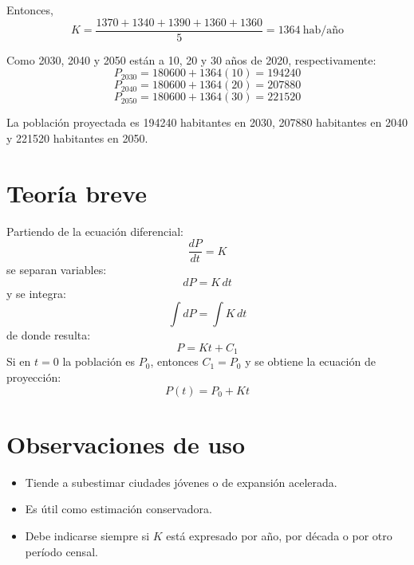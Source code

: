 \documentclass[11pt]{scrartcl}
\begin{document}
Entonces,
\[
  K=\frac{\num{1370}+\num{1340}+\num{1390}+\num{1360}+\num{1360}}{5}
    =\num{1364}\ \text{hab/año}
\]

Como 2030, 2040 y 2050 están a 10, 20 y 30 años de 2020, respectivamente:
\[
  P_{2030}=\num{180600}+\num{1364}(10)=\num{194240}
\]
\[
  P_{2040}=\num{180600}+\num{1364}(20)=\num{207880}
\]
\[
  P_{2050}=\num{180600}+\num{1364}(30)=\num{221520}
\]

\begin{icvwarning}
La población proyectada es \num{194240} habitantes en 2030,
\num{207880} habitantes en 2040 y \num{221520} habitantes en 2050.
\end{icvwarning}

\section{Teoría breve}

Partiendo de la ecuación diferencial:
\[
  \frac{dP}{dt}=K
\]
se separan variables:
\[
  dP=K\,dt
\]
y se integra:
\[
  \int dP=\int K\,dt
\]
de donde resulta:
\[
  P=Kt+C_1
\]
Si en \(t=0\) la población es \(P_0\), entonces \(C_1=P_0\) y se obtiene
la ecuación de proyección:
\[
  P(t)=P_0+Kt
\]

\section{Observaciones de uso}
\begin{itemize}
  \item Tiende a subestimar ciudades jóvenes o de expansión acelerada.
  \item Es útil como estimación conservadora.
  \item Debe indicarse siempre si \(K\) está expresado por año, por
    década o por otro período censal.
\end{itemize}
\end{document}
